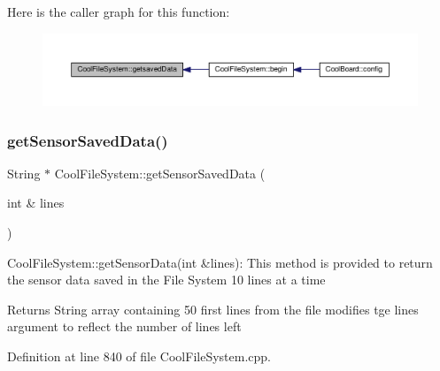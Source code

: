 Here is the caller graph for this function\+:\nopagebreak
\begin{figure}[H]
\begin{center}
\leavevmode
\includegraphics[width=350pt]{db/d0c/class_cool_file_system_a70701d05e811604af1b531f4f6dc69ed_icgraph}
\end{center}
\end{figure}
\mbox{\label{class_cool_file_system_a3223ffff4266a6300988fab956d6b4b2}} 
\subsubsection{\texorpdfstring{get\+Sensor\+Saved\+Data()}{getSensorSavedData()}}
{\footnotesize\ttfamily String $\ast$ Cool\+File\+System\+::get\+Sensor\+Saved\+Data (\begin{DoxyParamCaption}\item[{int \&}]{lines }\end{DoxyParamCaption})}

Cool\+File\+System\+::get\+Sensor\+Data(int \&lines)\+: This method is provided to return the sensor data saved in the File System 10 lines at a time

\begin{DoxyReturn}{Returns}
String array containing 50 first lines from the file modifies tge lines argument to reflect the number of lines left 
\end{DoxyReturn}


Definition at line 840 of file Cool\+File\+System.\+cpp.


